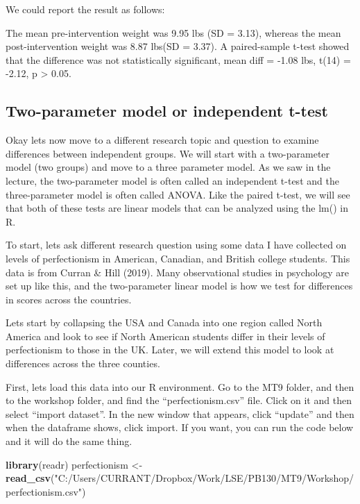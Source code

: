 \documentclass[
]{article}
\newenvironment{Shaded}{\begin{snugshade}}{\end{snugshade}}
\newcommand{\FunctionTok}[1]{\textcolor[rgb]{0.13,0.29,0.53}{\textbf{#1}}}
\newcommand{\NormalTok}[1]{#1}
\newcommand{\OtherTok}[1]{\textcolor[rgb]{0.56,0.35,0.01}{#1}}
\newcommand{\StringTok}[1]{\textcolor[rgb]{0.31,0.60,0.02}{#1}}
\begin{document}
We could report the result as follows:

The mean pre-intervention weight was 9.95 lbs (SD = 3.13), whereas the
mean post-intervention weight was 8.87 lbs(SD = 3.37). A paired-sample
t-test showed that the difference was not statistically significant,
mean diff = -1.08 lbs, t(14) = -2.12, p \textgreater{} 0.05.

\subsection{Two-parameter model or independent
t-test}\label{two-parameter-model-or-independent-t-test}

Okay lets now move to a different research topic and question to examine
differences between independent groups. We will start with a
two-parameter model (two groups) and move to a three parameter model. As
we saw in the lecture, the two-parameter model is often called an
independent t-test and the three-parameter model is often called ANOVA.
Like the paired t-test, we will see that both of these tests are linear
models that can be analyzed using the lm() in R.

To start, lets ask different research question using some data I have
collected on levels of perfectionism in American, Canadian, and British
college students. This data is from Curran \& Hill (2019). Many
observational studies in psychology are set up like this, and the
two-parameter linear model is how we test for differences in scores
across the countries.

Lets start by collapsing the USA and Canada into one region called North
America and look to see if North American students differ in their
levels of perfectionism to those in the UK. Later, we will extend this
model to look at differences across the three counties.

First, lets load this data into our R environment. Go to the MT9 folder,
and then to the workshop folder, and find the ``perfectionism.csv''
file. Click on it and then select ``import dataset''. In the new window
that appears, click ``update'' and then when the dataframe shows, click
import. If you want, you can run the code below and it will do the same
thing.

\begin{Shaded}
\begin{Highlighting}[]
\FunctionTok{library}\NormalTok{(readr)}
\NormalTok{perfectionism }\OtherTok{\textless{}{-}} \FunctionTok{read\_csv}\NormalTok{(}\StringTok{"C:/Users/CURRANT/Dropbox/Work/LSE/PB130/MT9/Workshop/perfectionism.csv"}\NormalTok{)}
\end{Highlighting}
\end{Shaded}
\end{document}
